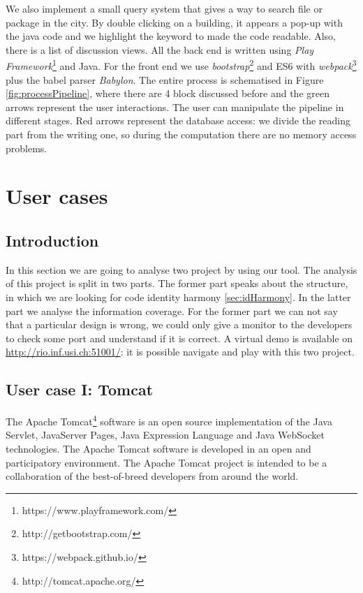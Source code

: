 \documentclass[]{usiinfbachelorproject}
\begin{document}
We also implement a small query system that gives a way to search file or package in the city. By double clicking on a building, it appears a pop-up with the java code and we highlight the keyword to made the code readable. Also, there is a list of discussion views.
All the back end is written using \textit{Play Framework}\footnote{https://www.playframework.com/} and Java.  For the front end we use \textit{bootstrap}\footnote{http://getbootstrap.com/} and ES6 with \textit{webpack}\footnote{https://webpack.github.io/} plus the babel parser \textit{Babylon}.
The entire process is schematised in Figure \ref{fig:processPipeline}, where there are 4 block discussed before and the green arrows represent the user interactions. The user can manipulate the pipeline in different stages.
Red arrows represent the database access: we divide the reading part from the writing one, so during the computation there are no memory access problems. 





   





\newpage
\section{User cases} \label{evaluation}

\subsection{Introduction}
In this section we are going to analyse two project by using our tool. 
The analysis of this project is split in two parts. The former part speaks about the structure, in which we are looking for code identity harmony \ref{sec:idHarmony}. In the latter part we analyse the information coverage. 
For the former part we can not say that a particular design is wrong, we could only give a monitor to the developers to check some port and understand if it is correct.
A virtual demo is available on \url{http://rio.inf.usi.ch:51001/}: it is possible navigate and play with this two project. 

\subsection{User case I: Tomcat}
The Apache Tomcat\footnote{http://tomcat.apache.org/} software is an open source implementation of the Java Servlet, JavaServer Pages, Java Expression Language and Java WebSocket technologies. 
The Apache Tomcat software is developed in an open and participatory environment. The Apache Tomcat project is intended to be a collaboration of the best-of-breed developers from around the world.
\end{document}
